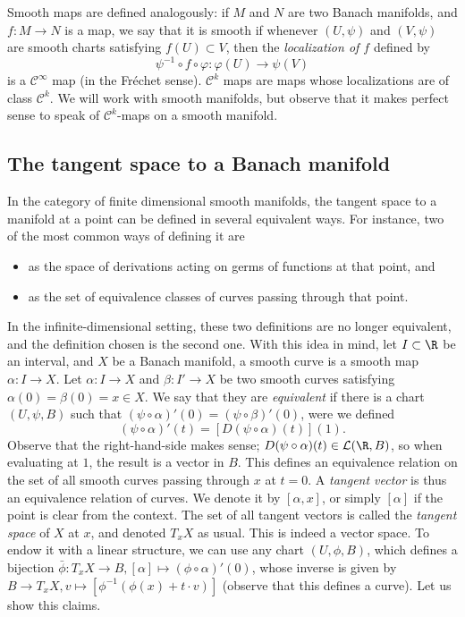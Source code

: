 Smooth maps are defined analogously: if \(M\) and \(N\) are two Banach manifolds, and \(f \colon M \to N\) is a map, we say that it is smooth if whenever \((U, \psi)\) and \((V, \psi)\) are smooth charts satisfying \(f(U) \subset V\), then the \textit{localization of \(f\)} defined by 
\[
\psi^{-1}\circ f \circ \varphi\colon \varphi(U) \to \psi(V) 
\]
is a \(\mathscr{C}^\infty\) map (in the Fréchet sense). \(\mathscr{C}^k\) maps are maps whose localizations are of class \(\mathscr{C}^k\). We will work with smooth manifolds, but observe that it makes perfect sense to speak of \(\mathscr{C}^k\)-maps on a smooth manifold.

\subsection{The tangent space to a Banach manifold}
In the category of finite dimensional smooth manifolds, the tangent space to a manifold at a point can be defined in several equivalent ways. For instance, two of the most common ways of defining it are 
\begin{itemize}
    \item as the space of derivations acting on germs of functions at that point, and
    \item as the set of equivalence classes of curves passing through that point.
\end{itemize}
In the infinite-dimensional setting, these two definitions are no longer equivalent, and the definition chosen is the second one. With this idea in mind, let \(I \subset \R\) be an interval, and \(X\) be a Banach manifold, a smooth curve is a smooth map \(\alpha \colon I \to X\). Let \(\alpha\colon I \to X\) and \(\beta \colon I' \to X\) be two smooth curves satisfying \(\alpha(0)=\beta(0)=x \in X\). We say that they are \textit{equivalent} if there is a chart \((U, \psi, B)\) such that \((\psi \circ \alpha)'(0)=(\psi \circ \beta)'(0)\), were we defined
\[
(\psi \circ \alpha)'(t)=[D(\psi \circ \alpha)(t)](1).
\]
Observe that the right-hand-side makes sense; \(D(\psi \circ \alpha)(t) \in \mathcal{L}(\R, B)\), so when evaluating at \(1\), the result is a vector in \(B\). This defines an equivalence relation on the set of all smooth curves passing through \(x\) at $t=0$. A \textit{tangent vector} is thus an equivalence relation of curves. We denote it by \([\alpha, x]\), or simply \([\alpha]\) if the point is clear from the context. The set of all tangent vectors is called the \textit{tangent space} of \(X\) at \(x\), and denoted \(T_xX\) as usual. This is indeed a vector space. To endow it with a linear structure, we can use any chart \((U, \phi, B)\), which defines a bijection \(\bar \phi\colon  T_xX \to B, [\alpha] \mapsto (\phi \circ \alpha)'(0)\), whose inverse is given by \(B \to T_xX,v \mapsto [\phi^{-1}(\phi(x)+t\cdot v)]\) (observe that this defines a curve). Let us show this claims.

